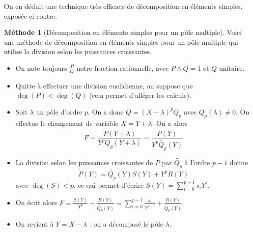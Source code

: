 \documentclass[french]{book}
\theoremstyle{plain}
\theoremstyle{definition}
\newtheorem{met}{Méthode}[chapter]
\theoremstyle{remark}
\begin{document}
On en déduit une technique très efficace de décomposition en éléments simples, exposée ci-contre.
\begin{met}[Décomposition en éléments simples pour un pôle multiple]
	Voici une méthode de décomposition en éléments simples pour un pôle multiple qui utilise la division selon les puissances croissantes.
	\begin{itemize}
		\item On note toujours $\displaystyle\frac{P}{Q}$	notre fraction rationnelle, avec $P\wedge Q=1$ et $Q$ unitaire.
		\item Quitte à effectuer une division euclidienne, on suppose que $\deg(P) < \deg(Q)$ (cela permet d'alléger les calculs).
		\item Soit $\lambda$ un pôle d'ordre $p$. On a donc $Q=(X-\lambda)^pQ_p$ avec $Q_p(\lambda)\neq 0$. On effectue le changement de variable $X=Y+\lambda$. On a alors $$F=\frac{P(Y+\lambda)}{Y^pQ_p(Y+\lambda)}=\frac{\tilde{P}(Y)}{Y^p\tilde{Q_p}(Y)}$$
		\item La division selon les puissances croissantes de $\overline{P}$ par $\tilde{Q_p}$ à l'ordre $p-1$ donne $$\tilde{P}(Y)=\tilde{Q_p}(Y)S(Y)+Y^pR(Y)$$
		avec $\deg(S) < p$, ce qui permet d'écrire $\displaystyle S(Y)=\sum_{i=0}^{p-1}s_iY^i$.
		\item On écrit alors $\displaystyle F=\frac{S(Y)}{Y^p}+\frac{R(Y)}{\tilde{Q_p}(Y)}=\sum_{i=0}^{p-1}\frac{s_i}{Y^{p-i}}+\frac{R(Y)}{\tilde{Q_p}(Y)}$.
		\item On revient à $Y=X-\lambda$ : on a décomposé le pôle $\lambda$.
	\end{itemize}
\end{met}
\end{document}
